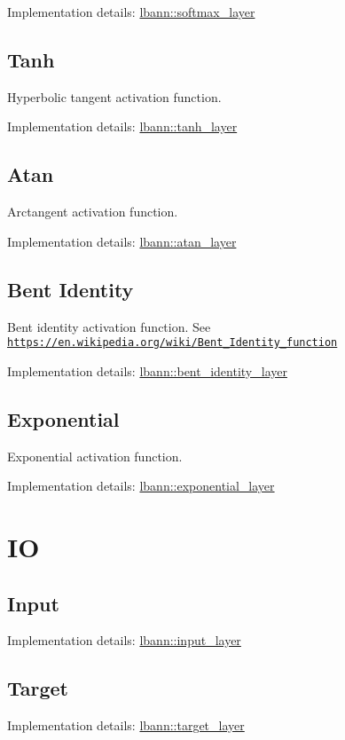 Implementation details\+: \hyperlink{classlbann_1_1softmax__layer}{lbann\+::softmax\+\_\+layer}\hypertarget{layers_tanh}{}\subsection{Tanh}\label{layers_tanh}
Hyperbolic tangent activation function.

Implementation details\+: \hyperlink{classlbann_1_1tanh__layer}{lbann\+::tanh\+\_\+layer}\hypertarget{layers_atan}{}\subsection{Atan}\label{layers_atan}
Arctangent activation function.

Implementation details\+: \hyperlink{classlbann_1_1atan__layer}{lbann\+::atan\+\_\+layer}\hypertarget{layers_bent_identity}{}\subsection{Bent Identity}\label{layers_bent_identity}
Bent identity activation function. See \href{https://en.wikipedia.org/wiki/Bent_Identity_function}{\tt https\+://en.\+wikipedia.\+org/wiki/\+Bent\+\_\+\+Identity\+\_\+function}

Implementation details\+: \hyperlink{classlbann_1_1bent__identity__layer}{lbann\+::bent\+\_\+identity\+\_\+layer}\hypertarget{layers_exponential}{}\subsection{Exponential}\label{layers_exponential}
Exponential activation function.

Implementation details\+: \hyperlink{classlbann_1_1exponential__layer}{lbann\+::exponential\+\_\+layer}\hypertarget{layers_i_o}{}\section{IO}\label{layers_i_o}
\hypertarget{layers_input}{}\subsection{Input}\label{layers_input}
Implementation details\+: \hyperlink{classlbann_1_1input__layer}{lbann\+::input\+\_\+layer} \hypertarget{layers_target}{}\subsection{Target}\label{layers_target}
Implementation details\+: \hyperlink{classlbann_1_1target__layer}{lbann\+::target\+\_\+layer} 